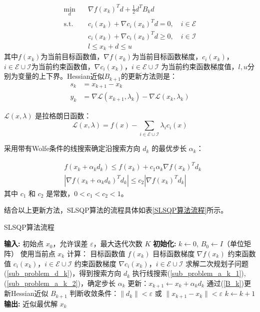 \documentclass[a4paper,8pt,twocolumn]{article} %
\begin{document}
\begin{align}
    \min_{d} \quad & \nabla f(x_k)^T d + \frac{1}{2}d^T B_k d \\
    \text{s.t.} \quad & c_i(x_k) + \nabla c_i(x_k)^T d = 0, \quad i \in \mathcal{E} \\
    & c_i(x_k) + \nabla c_i(x_k)^T d \geq 0, \quad i \in \mathcal{I} \\
    & l \leq x_k + d \leq u
    \label{sub_problem_d_k}
\end{align}
其中$f(x_k)$为当前目标函数值，$\nabla f(x_k)$为当前目标函数梯度，$c_i(x_k)$，$i \in \mathcal{E} \cup \mathcal{I}$为当前约束函数值，$\nabla c_i(x_k)$，$i \in \mathcal{E} \cup \mathcal{I}$
为当前约束函数梯度值，$l,u$分别为变量的上下界。Hessian近似$B_{k+1}$的更新方法则是：
\begin{align}
s_k &= x_{k+1} - x_k \\
y_k &= \nabla \mathcal{L}(x_{k+1}, \lambda_k) - \nabla \mathcal{L}(x_k, \lambda_k)
\label{B_k}
\end{align}

$\mathcal{L}(x, \lambda)$ 是拉格朗日函数：
\begin{equation}
\mathcal{L}(x, \lambda) = f(x) - \sum_{i \in \mathcal{E} \cup \mathcal{I}} \lambda_i c_i(x)
\end{equation}

采用带有Wolfe条件的线搜索确定沿搜索方向 $d_k$ 的最优步长 $\alpha_k$：

\begin{align}
& f(x_k + \alpha_k d_k) \leq f(x_k) + c_1 \alpha_k \nabla f(x_k)^T d_k \label{sub_problem_a_k_1} \\
& |\nabla f(x_k + \alpha_k d_k)^T d_k| \leq c_2 |\nabla f(x_k)^T d_k|
\label{sub_problem_a_k_2}
\end{align}
其中 $c_1$ 和 $c_2$ 是常数，$0 < c_1 < c_2 < 1$。

结合以上更新方法，SLSQP算法的流程具体如表\ref{SLSQP算法流程}所示。
\begin{algorithm}
\caption{SLSQP算法流程}
\label{SLSQP算法流程}
\begin{algorithmic}[1]
\State \textbf{输入:} 初始点 $x_0$，允许误差 $\varepsilon$，最大迭代次数 $K$
\State \textbf{初始化:} $k \leftarrow 0$, $B_0 \leftarrow I$（单位矩阵）
    \State 使用当前点 $x_k$ 计算：
    \State \quad 目标函数值 $f(x_k)$
    \State \quad 目标函数梯度 $\nabla f(x_k)$
    \State \quad 约束函数值 $c_i(x_k)$，$i \in \mathcal{E} \cup \mathcal{I}$
    \State \quad 约束函数梯度 $\nabla c_i(x_k)$，$i \in \mathcal{E} \cup \mathcal{I}$
    \State 求解二次规划子问题(\ref{sub_problem_d_k})，得到搜索方向 $d_k$
    \State 执行线搜索(\ref{sub_problem_a_k_1}), (\ref{sub_problem_a_k_2})，确定步长 $\alpha_k$
    \State 更新：$x_{k+1} \leftarrow x_k + \alpha_k d_k$
    \State 通过(\ref{B_k})更新Hessian近似 $B_{k+1}$
    \State 判断收敛条件：$\|d_k\| < \varepsilon$ 或 $\|x_{k+1} - x_k\| < \varepsilon$
    \State $k \leftarrow k + 1$
\EndWhile
\State \textbf{输出:} 近似最优解 $x_k$
\end{algorithmic}
\end{algorithm}
\end{document}
